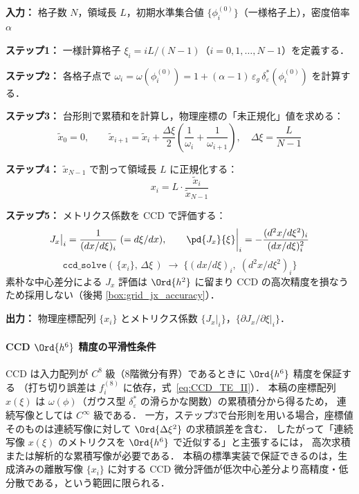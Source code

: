 \begin{tcolorbox}[resultbox, title={1次元格子点座標の構成}]
\textbf{入力：} 格子数 $N$，領域長 $L$，初期水準集合値 $\{\phi^{(0)}_i\}$（一様格子上），密度倍率 $\alpha$

\textbf{ステップ1：} 一様計算格子 $\xi_i = iL/(N-1)$（$i=0,1,\ldots,N-1$）を定義する．

\textbf{ステップ2：} 各格子点で $\omega_i = \omega(\phi^{(0)}_i) = 1 + (\alpha-1)\,\varepsilon_g\,\delta_\varepsilon^*(\phi^{(0)}_i)$ を計算する．

\textbf{ステップ3：} 台形則で累積和を計算し，物理座標の「未正規化」値を求める：
\[
  \tilde{x}_0 = 0, \qquad
  \tilde{x}_{i+1} = \tilde{x}_i + \frac{\Delta\xi}{2}\left(\frac{1}{\omega_i} + \frac{1}{\omega_{i+1}}\right),
  \quad \Delta\xi = \frac{L}{N-1}
\]

\textbf{ステップ4：} $\tilde{x}_{N-1}$ で割って領域長 $L$ に正規化する：
\[
  x_i = L \cdot \frac{\tilde{x}_i}{\tilde{x}_{N-1}}
\]

\textbf{ステップ5：} メトリクス係数を CCD で評価する：
\[
  J_x\big|_i = \frac{1}{(dx/d\xi)_i} \;(= d\xi/dx), \qquad
  \pd{J_x}{\xi}\bigg|_i = -\frac{(d^2x/d\xi^2)_i}{(dx/d\xi)_i^2}
\]
\[
  \texttt{ccd\_solve}(\,\{x_i\},\,\Delta\xi\,) \;\to\; \bigl\{(dx/d\xi)_i,\;(d^2x/d\xi^2)_i\bigr\}
\]
素朴な中心差分による $J_x$ 評価は $\Ord{h^2}$ に留まり CCD の高次精度を損なうため採用しない（後掲 \ref{box:grid_jx_accuracy}）．

\textbf{出力：} 物理座標配列 $\{x_i\}$ とメトリクス係数 $\{J_x|_i\}$，$\{\partial J_x/\partial\xi|_i\}$．
\end{tcolorbox}

\paragraph{\texorpdfstring{CCD $\Ord{h^6}$ 精度の平滑性条件}{CCD O(h^6) 精度の平滑性条件}}
CCD は入力配列が $C^8$ 級（8階微分有界）であるときに $\Ord{h^6}$ 精度を保証する
（打ち切り誤差は $f^{(8)}_i$ に依存，式~\eqref{eq:CCD_TE_II}）．
本稿の座標配列 $x(\xi)$ は $\omega(\phi)$（ガウス型 $\delta_\varepsilon^*$ の滑らかな関数）の累積積分から得るため，
連続写像としては $C^\infty$ 級である．
一方，ステップ3で台形則を用いる場合，座標値そのものは連続写像に対して
$\Ord{\Delta\xi^2}$ の求積誤差を含む．
したがって「連続写像 $x(\xi)$ のメトリクスを $\Ord{h^6}$ で近似する」と主張するには，
高次求積または解析的な累積写像が必要である．
本稿の標準実装で保証できるのは，生成済みの離散写像 $\{x_i\}$ に対する
CCD 微分評価が低次中心差分より高精度・低分散である，という範囲に限られる．

